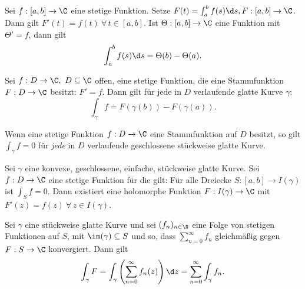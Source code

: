 \lecture
		\begin{thm}
			Sei $ f:[a,b] \to \C $ eine stetige Funktion. Setze $ F(t) = \int_{a}^b f(s) \d s, F: [a,b] \to \C $. Dann gilt $ F'(t) = f(t) \ \forall\, t \in [a,b]. $ Ist $ \Theta: [a,b] \to \C $ eine Funktion mit $ \Theta' = f $, dann gilt 
			$$ \int_a^b f(s) \d s = \Theta(b) - \Theta(a). $$
		\end{thm}
		
		\begin{cor}
			Sei $ f: D \to \C,\ D \subseteq \C $ offen, eine stetige Funktion, die eine Stammfunktion $ F: D \to \C $ besitzt: $ F' = f $. Dann gilt für jede in $D$ verlaufende glatte Kurve $\gamma$:
			\[ \int_\gamma f = F(\gamma(b)) - F(\gamma(a)). \]
		\end{cor}
		
		\begin{cor}
			Wenn eine stetige Funktion $ f: D \to \C $ eine Stammfunktion auf $D$ besitzt, so gilt $ \int_\gamma f = 0 $ für \emph{jede} in $D$ verlaufende geschlossene stückweise glatte Kurve.
		\end{cor}
		\begin{thm}
			Sei $\gamma$ eine konvexe, geschlossene, einfache, stückweise glatte Kurve. Sei $ f: D \to \C $ eine stetige Funktion für die gilt: Für alle Dreiecke $ S: [a,b] \to I(\gamma) $ ist $ \int_S f=0 $. Dann existiert eine holomorphe Funktion $ F: I(\gamma) \to \C $ mit $ F'(z) = f(z) \ \forall\, z \in I(\gamma) $.
		\end{thm}
		
		\begin{thm}
			Sei $\gamma$ eine stückweise glatte Kurve und sei $ (f_n)_{n \in \N} $ eine Folge von stetigen Funktionen auf $S$, mit $ \im(\gamma) \subseteq S $ und so, dass $ \sum\limits_{n=0}^\infty f_n $ gleichmäßig gegen $ F:S \to \C $ konvergiert. Dann gilt
			\[ \int_\gamma F = \int_\gamma \left( \sum_{n=0}^\infty f_n(z) \right) \d z = \sum_{n=0}^\infty \int_\gamma f_n. \]
		\end{thm}